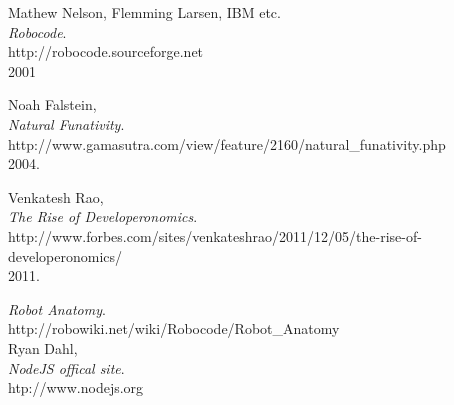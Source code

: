 \documentclass[12pt]{article}
\begin{document}
\begin{thebibliography}{9}

	Mathew Nelson, Flemming Larsen, IBM etc.\\
	\emph{Robocode}.\\
	http://robocode.sourceforge.net\\
	2001

	Noah Falstein,\\
	\emph{Natural Funativity}.\\
	http://www.gamasutra.com/view/feature/2160/natural\_funativity.php\\
	2004.

	Venkatesh Rao,\\
	\emph{The Rise of Developeronomics}.\\
	http://www.forbes.com/sites/venkateshrao/2011/12/05/the-rise-of-developeronomics/\\
	2011.

	\emph{Robot Anatomy}. \\
	http://robowiki.net/wiki/Robocode/Robot\_Anatomy\\

	Ryan Dahl,\\
	\emph{NodeJS offical site}.\\
	htp://www.nodejs.org

\end{thebibliography}

	
\end{document}
